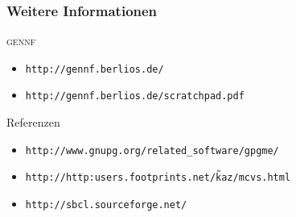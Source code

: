 \documentclass[german]{beamer}
\newcommand{\GENNF}{\textsc{gennf}}
\begin{document}
\begin{frame}
  \frametitle{Weitere Informationen}
  \begin{block}{\GENNF}
    \begin{itemize}
    \item \tt{http://gennf.berlios.de/}
    \item \tt{http://gennf.berlios.de/scratchpad.pdf}
    \end{itemize}
  \end{block}
  \begin{block}{Referenzen}
    \begin{itemize}
    \item \tt{http://www.gnupg.org/related\_software/gpgme/}
    \item \tt{http://http:users.footprints.net/\~kaz/mcvs.html}
    \item \tt{http://sbcl.sourceforge.net/}
    \end{itemize}
  \end{block}
\end{frame}
\end{document}
